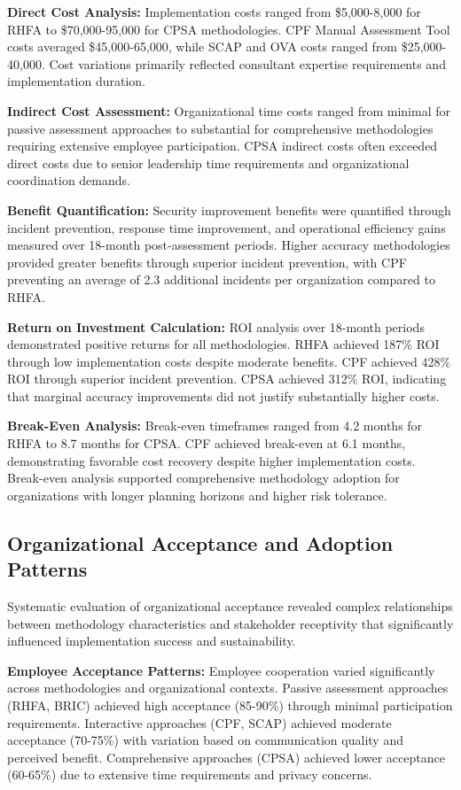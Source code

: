 \documentclass[10pt, twocolumn]{article}
\begin{document}
\textbf{Direct Cost Analysis:} Implementation costs ranged from \$5,000-8,000 for RHFA to \$70,000-95,000 for CPSA methodologies. CPF Manual Assessment Tool costs averaged \$45,000-65,000, while SCAP and OVA costs ranged from \$25,000-40,000. Cost variations primarily reflected consultant expertise requirements and implementation duration.

\textbf{Indirect Cost Assessment:} Organizational time costs ranged from minimal for passive assessment approaches to substantial for comprehensive methodologies requiring extensive employee participation. CPSA indirect costs often exceeded direct costs due to senior leadership time requirements and organizational coordination demands.

\textbf{Benefit Quantification:} Security improvement benefits were quantified through incident prevention, response time improvement, and operational efficiency gains measured over 18-month post-assessment periods. Higher accuracy methodologies provided greater benefits through superior incident prevention, with CPF preventing an average of 2.3 additional incidents per organization compared to RHFA.

\textbf{Return on Investment Calculation:} ROI analysis over 18-month periods demonstrated positive returns for all methodologies. RHFA achieved 187\% ROI through low implementation costs despite moderate benefits. CPF achieved 428\% ROI through superior incident prevention. CPSA achieved 312\% ROI, indicating that marginal accuracy improvements did not justify substantially higher costs.

\textbf{Break-Even Analysis:} Break-even timeframes ranged from 4.2 months for RHFA to 8.7 months for CPSA. CPF achieved break-even at 6.1 months, demonstrating favorable cost recovery despite higher implementation costs. Break-even analysis supported comprehensive methodology adoption for organizations with longer planning horizons and higher risk tolerance.

\subsection{Organizational Acceptance and Adoption Patterns}

Systematic evaluation of organizational acceptance revealed complex relationships between methodology characteristics and stakeholder receptivity that significantly influenced implementation success and sustainability.

\textbf{Employee Acceptance Patterns:} Employee cooperation varied significantly across methodologies and organizational contexts. Passive assessment approaches (RHFA, BRIC) achieved high acceptance (85-90\%) through minimal participation requirements. Interactive approaches (CPF, SCAP) achieved moderate acceptance (70-75\%) with variation based on communication quality and perceived benefit. Comprehensive approaches (CPSA) achieved lower acceptance (60-65\%) due to extensive time requirements and privacy concerns.
\end{document}

